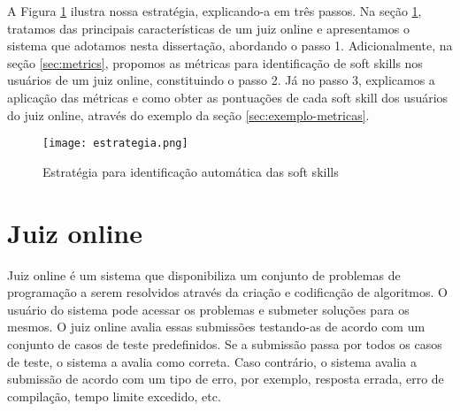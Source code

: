 

A Figura \ref{fig:estrategia} ilustra nossa estratégia, explicando-a em três passos.
Na seção \ref{sec:huxley}, tratamos das principais características de um juiz online e apresentamos o sistema que adotamos nesta dissertação, abordando o passo 1. Adicionalmente, na seção \ref{sec:metrics}, propomos as métricas para identificação de soft skills nos usuários de um juiz online, constituindo o passo 2. Já no passo 3, explicamos a aplicação das métricas e como obter as pontuações de cada soft skill dos usuários do juiz online, através do exemplo da seção \ref{sec:exemplo-metricas}.

\begin{figure}[ht]
\centering
\caption{\small Estratégia para identificação automática das soft skills} 
\texttt{[image: estrategia.png]}
\label{fig:estrategia}
\end{figure}

\section{Juiz online} 
\label{sec:huxley}

Juiz online é um sistema que disponibiliza um conjunto de problemas de programação a serem resolvidos através da criação e codificação de algoritmos. O usuário do sistema pode acessar os problemas e submeter soluções para os mesmos. O juiz online avalia essas submissões testando-as de acordo com um conjunto de casos de teste predefinidos. Se a submissão passa por todos os casos de teste, o sistema a avalia como correta. Caso contrário, o sistema avalia a submissão de acordo com um tipo de erro, por exemplo, resposta errada, erro de compilação, tempo limite excedido, etc.

